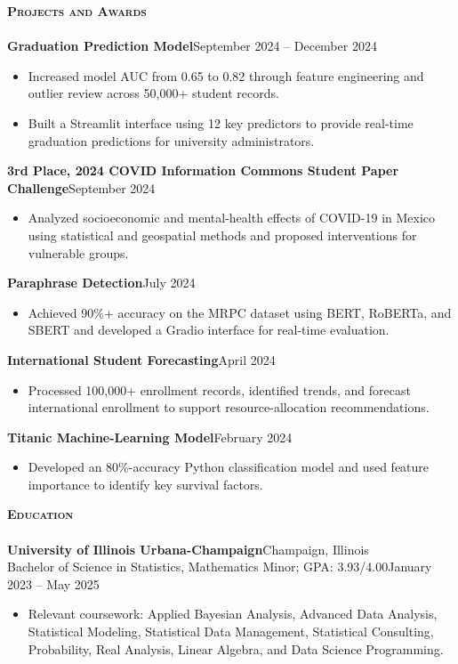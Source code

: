 \documentclass[a4paper]{article}
\newcommand{\lineunder}{
    \vspace*{-8pt} \\
    \hspace*{-18pt} \hrulefill \\
}
\newcommand{\header}[1]{
    \Needspace{4\baselineskip}
    {\hspace*{-18pt}\vspace*{6pt} \textsc{#1}}
    \vspace*{-6pt} \lineunder
}
\begin{document}
\vspace*{1mm}
\header{\textbf{Projects and Awards}}

\textbf{Graduation Prediction Model}\hfill September 2024 -- December 2024
\begin{itemize}[noitemsep]
  \item Increased model AUC from 0.65 to 0.82 through feature engineering and outlier review across 50,000+ student records.
  \item Built a Streamlit interface using 12 key predictors to provide real-time graduation predictions for university administrators.
\end{itemize}

\textbf{3rd Place, 2024 COVID Information Commons Student Paper Challenge}\hfill September 2024
\begin{itemize}[noitemsep]
  \item Analyzed socioeconomic and mental-health effects of COVID-19 in Mexico using statistical and geospatial methods and proposed interventions for vulnerable groups.
\end{itemize}

\textbf{Paraphrase Detection}\hfill July 2024
\begin{itemize}[noitemsep]
  \item Achieved 90\%+ accuracy on the MRPC dataset using BERT, RoBERTa, and SBERT and developed a Gradio interface for real-time evaluation.
\end{itemize}

\textbf{International Student Forecasting}\hfill April 2024
\begin{itemize}[noitemsep]
  \item Processed 100,000+ enrollment records, identified trends, and forecast international enrollment to support resource-allocation recommendations.
\end{itemize}

\textbf{Titanic Machine-Learning Model}\hfill February 2024
\begin{itemize}[noitemsep]
  \item Developed an 80\%-accuracy Python classification model and used feature importance to identify key survival factors.
\end{itemize}

\vspace*{1mm}
\header{\textbf{Education}}

\textbf{University of Illinois Urbana-Champaign}\hfill Champaign, Illinois\\
Bachelor of Science in Statistics, Mathematics Minor; GPA: 3.93/4.00\hfill January 2023 -- May 2025
\begin{itemize}[noitemsep]
  \item Relevant coursework: Applied Bayesian Analysis, Advanced Data Analysis, Statistical Modeling, Statistical Data Management, Statistical Consulting, Probability, Real Analysis, Linear Algebra, and Data Science Programming.
\end{itemize}
\end{document}
